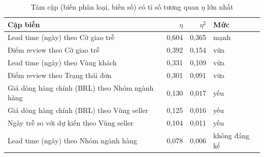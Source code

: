 \begin{table}[htbp]\centering\scriptsize\caption{Tám cặp (biến phân loại, biến số) có tỉ số tương quan $\eta$ lớn nhất}\label{tab:eta}
\begin{tabular}{p{7.2cm}rrl}\toprule
\textbf{Cặp biến} & $\eta$ & $\eta^2$ & \textbf{Mức}\\\midrule
Lead time (ngày) theo Cờ giao trễ & 0,604 & 0,365 & mạnh\\
Điểm review theo Cờ giao trễ & 0,392 & 0,154 & vừa\\
Lead time (ngày) theo Vùng khách & 0,331 & 0,109 & vừa\\
Điểm review theo Trạng thái đơn & 0,301 & 0,091 & vừa\\
Giá dòng hàng chính (BRL) theo Nhóm ngành hàng & 0,130 & 0,017 & yếu\\
Giá dòng hàng chính (BRL) theo Vùng seller & 0,125 & 0,016 & yếu\\
Ngày trễ so với dự kiến theo Vùng seller & 0,104 & 0,011 & yếu\\
Lead time (ngày) theo Nhóm ngành hàng & 0,078 & 0,006 & không đáng kể\\
\bottomrule\end{tabular}\end{table}
